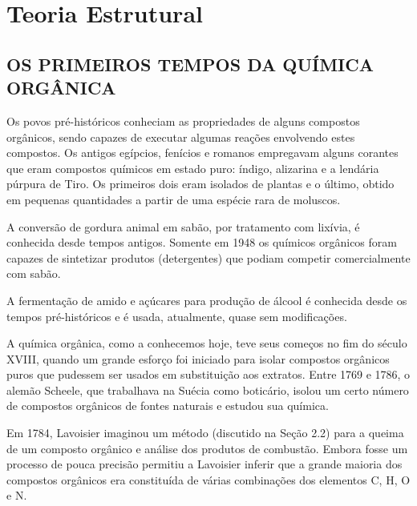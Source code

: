 \chapter{Teoria Estrutural}

\section{OS PRIMEIROS TEMPOS DA QUÍMICA ORGÂNICA}

Os povos pré-históricos conheciam as propriedades de alguns compostos orgânicos, sendo capazes de executar algumas reações envolvendo estes compostos. Os antigos egípcios, fenícios e romanos empregavam alguns corantes que eram compostos químicos em estado puro: índigo, alizarina e a lendária púrpura de Tiro. Os primeiros dois eram isolados de plantas e o último, obtido em pequenas quantidades a partir de uma espécie rara de moluscos.

A conversão de gordura animal em sabão, por tratamento com lixívia, é conhecida desde tempos antigos. Somente em 1948 os químicos orgânicos foram capazes de sintetizar produtos (detergentes) que podiam competir comercialmente com sabão. 

A fermentação de amido e açúcares para produção de álcool é conhecida desde os tempos pré-históricos e é usada, atualmente, quase sem modificações. 

A química orgânica, como a conhecemos hoje, teve seus começos no fim do século XVIII, quando um grande esforço foi iniciado para isolar compostos orgânicos puros que pudessem ser usados em substituição aos extratos. Entre 1769 e 1786, o alemão Scheele, que trabalhava na Suécia como boticário, isolou um certo número de compostos orgânicos de fontes naturais e estudou sua química. 

Em 1784, Lavoisier imaginou um método (discutido na Seção 2.2) para a queima de um composto orgânico e análise dos produtos de combustão. Embora fosse um processo de pouca precisão permitiu a Lavoisier inferir que a grande maioria dos compostos orgânicos era constituída de várias combinações dos elementos C, H, O e N. 

